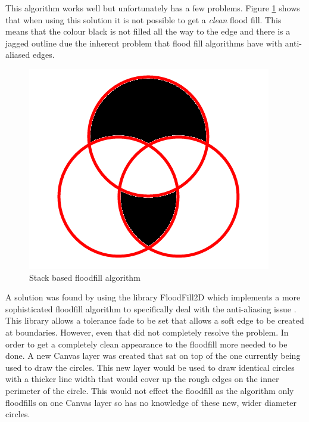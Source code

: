 \documentclass[12pt,a4paper]{report}
\begin{document}
This algorithm works well but unfortunately has a few problems. Figure \ref{fig:floodFillBad} shows that when using this solution it is not possible to get a \textit{clean} flood fill. This means that the colour black is not filled all the way to the edge and there is a jagged outline due the inherent problem that flood fill algorithms have with anti-aliased edges.

\begin{figure}[h]
\centering
    \includegraphics[scale=0.5]{floodFillBad}
    \caption{Stack based floodfill algorithm}
    \label{fig:floodFillBad}
\end{figure}
\FloatBarrier

	A solution was found by using the library FloodFill2D which implements a more sophisticated floodfill algorithm to specifically deal with the anti-aliasing issue \citep{blindman67}. This library allows a tolerance fade to be set that allows a soft edge to be created at boundaries. However, even that did not completely resolve the problem. In order to get a completely clean appearance to the floodfill more needed to be done. A new Canvas layer was created that sat on top of the one currently being used to draw the circles. This new layer would be used to draw identical circles with a thicker line width that would cover up the rough edges on the inner perimeter of the circle. This would not effect the floodfill as the algorithm only floodfills on one Canvas layer so has no knowledge of these new, wider diameter circles.
	
\end{document}
